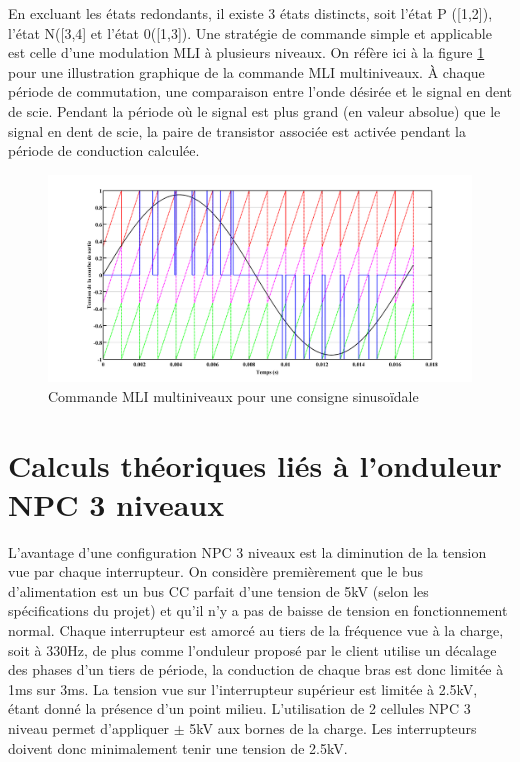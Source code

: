 En excluant les états redondants, il existe 3 états distincts, soit l'état P ([1,2]), l'état N([3,4] et l'état 0([1,3]). Une stratégie de commande simple et applicable est celle d'une modulation MLI à plusieurs niveaux. On réfère ici à la figure \ref{fig_MLI_ML} pour une illustration graphique de la commande MLI multiniveaux. À chaque période de commutation, une comparaison entre l'onde désirée et le signal en dent de scie. Pendant la période où le signal est plus grand (en valeur absolue) que le signal en dent de scie, la paire de transistor associée est activée pendant la période de conduction calculée. 

\begin{figure}[htb]
\centering
\includegraphics[scale=0.4]{fig/commande_NPC_1.png}
\caption{Commande MLI multiniveaux pour une consigne sinusoïdale}
\label{fig_MLI_ML}
\end{figure}

\section{Calculs théoriques liés à l'onduleur NPC 3 niveaux}
L'avantage d'une configuration NPC 3 niveaux est la diminution de la tension vue par chaque interrupteur. On considère premièrement que le bus d'alimentation est un bus CC parfait d'une tension de 5kV (selon les spécifications du projet) et qu'il n'y a pas de baisse de tension en fonctionnement normal. Chaque interrupteur est amorcé au tiers de la fréquence vue à la charge, soit à 330Hz, de plus comme l'onduleur proposé par le client utilise un décalage des phases d'un tiers de période, la conduction de chaque bras est donc limitée à 1ms sur 3ms. La tension vue sur l'interrupteur supérieur est limitée à 2.5kV, étant donné la présence d'un point milieu. L'utilisation de 2 cellules NPC 3 niveau permet d'appliquer $\pm$ 5kV aux bornes de la charge. Les interrupteurs doivent donc minimalement tenir une tension de 2.5kV. 

